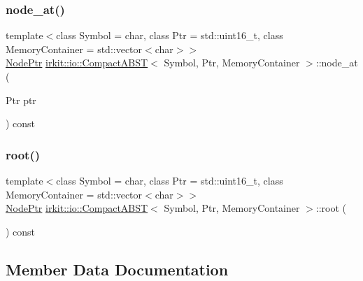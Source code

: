 \mbox{\label{classirkit_1_1io_1_1CompactABST_a6ef6afae469190875c8f49a37fa484e9}} 
\subsubsection{\texorpdfstring{node\+\_\+at()}{node\_at()}}
{\footnotesize\ttfamily template$<$class Symbol = char, class Ptr = std\+::uint16\+\_\+t, class Memory\+Container = std\+::vector$<$char$>$$>$ \\
\mbox{\hyperlink{structirkit_1_1io_1_1CompactABST_1_1NodePtr}{Node\+Ptr}} \mbox{\hyperlink{classirkit_1_1io_1_1CompactABST}{irkit\+::io\+::\+Compact\+A\+B\+ST}}$<$ Symbol, Ptr, Memory\+Container $>$\+::node\+\_\+at (\begin{DoxyParamCaption}\item[{Ptr}]{ptr }\end{DoxyParamCaption}) const\hspace{0.3cm}{\ttfamily [inline]}}

\mbox{\label{classirkit_1_1io_1_1CompactABST_a08d1b23d44415a0505e8abf5c723a16a}} 
\subsubsection{\texorpdfstring{root()}{root()}}
{\footnotesize\ttfamily template$<$class Symbol = char, class Ptr = std\+::uint16\+\_\+t, class Memory\+Container = std\+::vector$<$char$>$$>$ \\
\mbox{\hyperlink{structirkit_1_1io_1_1CompactABST_1_1NodePtr}{Node\+Ptr}} \mbox{\hyperlink{classirkit_1_1io_1_1CompactABST}{irkit\+::io\+::\+Compact\+A\+B\+ST}}$<$ Symbol, Ptr, Memory\+Container $>$\+::root (\begin{DoxyParamCaption}{ }\end{DoxyParamCaption}) const\hspace{0.3cm}{\ttfamily [inline]}}



\subsection{Member Data Documentation}
\mbox{\label{classirkit_1_1io_1_1CompactABST_a98a0e7d750d139b65ad0df0a04ed3cb0}} 
